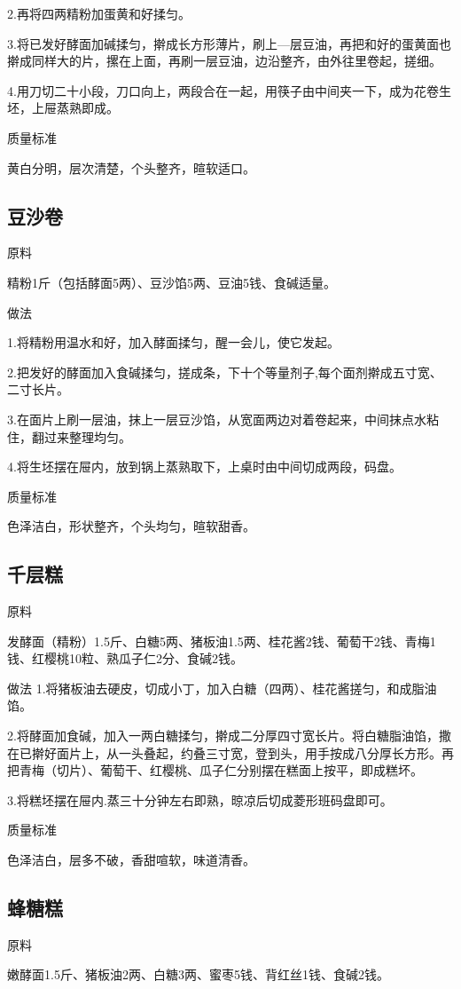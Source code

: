 \documentclass{ctexbook}
\begin{document}
2.再将四两精粉加蛋黄和好揉匀。

3.将已发好酵面加碱揉匀，擀成长方形薄片，刷上—层豆油，再把和好的蛋黄面也擀成同样大的片，摞在上面，再刷一层豆油，边沿整齐，由外往里卷起，搓细。

4.用刀切二十小段，刀口向上，两段合在一起，用筷子由中间夹一下，成为花卷生坯，上屉蒸熟即成。

质量标准

黄白分明，层次清楚，个头整齐，暄软适口。
\subsection{豆沙卷}
原料

精粉1斤（包括酵面5两）、豆沙馅5两、豆油5钱、食碱适量。

做法

1.将精粉用温水和好，加入酵面揉匀，醒一会儿，使它发起。

2.把发好的酵面加入食碱揉匀，搓成条，下十个等量剂子,每个面剂擀成五寸宽、二寸长片。

3.在面片上刷一层油，抹上一层豆沙馅，从宽面两边对着卷起来，中间抹点水粘住，翻过来整理均匀。

4.将生坯摆在屉内，放到锅上蒸熟取下，上桌时由中间切成两段，码盘。

质量标准

色泽洁白，形状整齐，个头均匀，暄软甜香。
\subsection{千层糕}
原料

发酵面（精粉）1.5斤、白糖5两、猪板油1.5两、桂花酱2钱、葡萄干2钱、青梅1钱、红樱桃10粒、熟瓜子仁2分、食碱2钱。

做法
1.将猪板油去硬皮，切成小丁，加入白糖（四两）、桂花酱搓匀，和成脂油馅。

2.将酵面加食碱，加入一两白糖揉匀，擀成二分厚四寸宽长片。将白糖脂油馅，撒在已擀好面片上，从一头叠起，约叠三寸宽，登到头，用手按成八分厚长方形。再把青梅（切片）、葡萄干、红樱桃、瓜子仁分别摆在糕面上按平，即成糕坏。

3.将糕坯摆在屉内.蒸三十分钟左右即熟，晾凉后切成菱形班码盘即可。

质量标准

色泽洁白，层多不破，香甜喧软，味道清香。
\subsection{蜂糖糕}
原料

嫩酵面1.5斤、猪板油2两、白糖3两、蜜枣5钱、背红丝1钱、食碱2钱。
\end{document}
